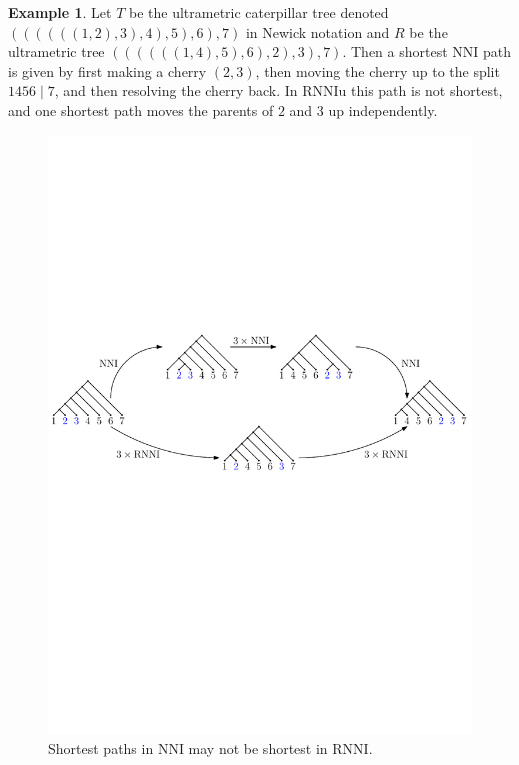\documentclass[11pt]{amsart}
\theoremstyle{definition}
\newtheorem{example}[lemma]{Example}
\newcommand{\nni}{\mathrm{NNI}}
\newcommand{\rnni}{\mathrm{RNNI}}
\newcommand{\rnniu}{\mathrm{RNNIu}}
\begin{document}
\begin{example}
Let $T$ be the ultrametric caterpillar tree denoted $((((((1, 2), 3), 4), 5), 6), 7)$ in Newick notation \autocite{felsenstein1990newick} and $R$ be the ultrametric tree $((((((1, 4), 5), 6), 2), 3), 7)$.
Then a shortest $\nni$ path is given by first making a cherry $(2,3)$, then moving the cherry up to the split $1456 \mid 7$, and then resolving the cherry back.
In $\rnniu$ this path is not shortest, and one shortest path moves the parents of $2$ and $3$ up independently.

\begin{figure}[ht]
\centering
\includegraphics[width=\textwidth]{NNI_VS_rNNI.pdf}
\caption{Shortest paths in $\nni$ may not be shortest in $\rnni$.}
\label{NNI_VS_rNNI.pdf}
\end{figure}
\end{example}
\end{document}
